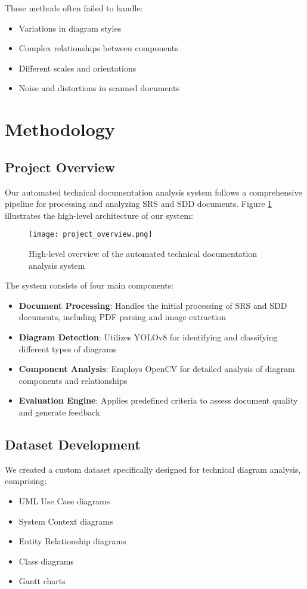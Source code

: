 \documentclass[conference]{IEEEtran}
\begin{document}
These methods often failed to handle:
\begin{itemize}
\item Variations in diagram styles
\item Complex relationships between components
\item Different scales and orientations
\item Noise and distortions in scanned documents
\end{itemize}

\section{Methodology}

\subsection{Project Overview}
Our automated technical documentation analysis system follows a comprehensive pipeline for processing and analyzing SRS and SDD documents. Figure \ref{fig:project_overview} illustrates the high-level architecture of our system:

\begin{figure}[H]
\centering
\texttt{[image: project\_overview.png]}
\caption{High-level overview of the automated technical documentation analysis system}
\label{fig:project_overview}
\end{figure}

The system consists of four main components:
\begin{itemize}
\item \textbf{Document Processing}: Handles the initial processing of SRS and SDD documents, including PDF parsing and image extraction
\item \textbf{Diagram Detection}: Utilizes YOLOv8 for identifying and classifying different types of diagrams
\item \textbf{Component Analysis}: Employs OpenCV for detailed analysis of diagram components and relationships
\item \textbf{Evaluation Engine}: Applies predefined criteria to assess document quality and generate feedback
\end{itemize}

\subsection{Dataset Development}
We created a custom dataset specifically designed for technical diagram analysis, comprising:
\begin{itemize}
\item UML Use Case diagrams
\item System Context diagrams
\item Entity Relationship diagrams
\item Class diagrams
\item Gantt charts
\end{itemize}
\end{document}
